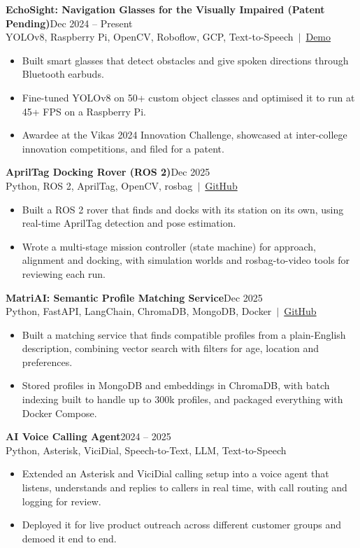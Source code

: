 \documentclass[a4paper,10pt]{article}
\newcommand{\project}[3]{\textbf{#1}\hfill #2\\{\small #3}\par\vspace{-2pt}}
\newcommand{\gap}{\vspace{5pt}}
\begin{document}
\project{EchoSight: Navigation Glasses for the Visually Impaired (Patent Pending)}{Dec 2024 -- Present}{YOLOv8, Raspberry Pi, OpenCV, Roboflow, GCP, Text-to-Speech \,$|$\, \href{https://drive.google.com/file/d/1r_dGlaLp-_ueKEicPEHzzcnC8IBGrJQT/view?usp=sharing}{Demo}}
\begin{itemize}
  \item Built smart glasses that detect obstacles and give spoken directions through Bluetooth earbuds.
  \item Fine-tuned YOLOv8 on 50+ custom object classes and optimised it to run at 45+ FPS on a Raspberry Pi.
  \item Awardee at the Vikas 2024 Innovation Challenge, showcased at inter-college innovation competitions, and filed for a patent.
\end{itemize}
\gap

\project{AprilTag Docking Rover (ROS 2)}{Dec 2025}{Python, ROS 2, AprilTag, OpenCV, rosbag \,$|$\, \href{https://github.com/nithin434/apriltag_rover}{GitHub}}
\begin{itemize}
  \item Built a ROS 2 rover that finds and docks with its station on its own, using real-time AprilTag detection and pose estimation.
  \item Wrote a multi-stage mission controller (state machine) for approach, alignment and docking, with simulation worlds and rosbag-to-video tools for reviewing each run.
\end{itemize}
\gap

\project{MatriAI: Semantic Profile Matching Service}{Dec 2025}{Python, FastAPI, LangChain, ChromaDB, MongoDB, Docker \,$|$\, \href{https://github.com/nithin434/matriAI}{GitHub}}
\begin{itemize}
  \item Built a matching service that finds compatible profiles from a plain-English description, combining vector search with filters for age, location and preferences.
  \item Stored profiles in MongoDB and embeddings in ChromaDB, with batch indexing built to handle up to 300k profiles, and packaged everything with Docker Compose.
\end{itemize}
\gap

\project{AI Voice Calling Agent}{2024 -- 2025}{Python, Asterisk, ViciDial, Speech-to-Text, LLM, Text-to-Speech}
\begin{itemize}
  \item Extended an Asterisk and ViciDial calling setup into a voice agent that listens, understands and replies to callers in real time, with call routing and logging for review.
  \item Deployed it for live product outreach across different customer groups and demoed it end to end.
\end{itemize}
\gap
\end{document}
